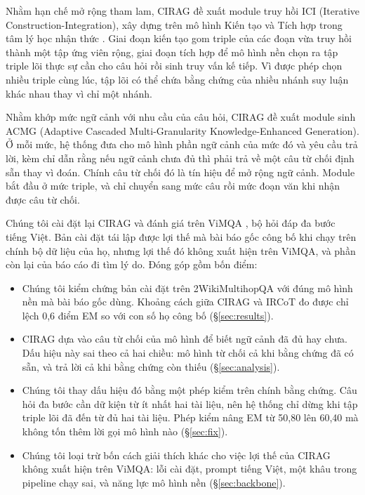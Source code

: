 \documentclass[11pt]{article}
\begin{document}
Nhằm hạn chế mở rộng tham lam, CIRAG đề xuất module truy hồi ICI (Iterative
Construction-Integration), xây dựng trên mô hình Kiến tạo và Tích hợp trong tâm lý học nhận
thức \citep{kintsch1978ci}. Giai đoạn kiến tạo gom triple của các đoạn vừa truy hồi thành
một tập ứng viên rộng, giai đoạn tích hợp để mô hình nền chọn ra tập triple lõi thực sự cần
cho câu hỏi rồi sinh truy vấn kế tiếp. Vì được phép chọn nhiều triple cùng lúc, tập lõi có
thể chứa bằng chứng của nhiều nhánh suy luận khác nhau thay vì chỉ một nhánh.

Nhằm khớp mức ngữ cảnh với nhu cầu của câu hỏi, CIRAG đề xuất module sinh ACMG (Adaptive
Cascaded Multi-Granularity Knowledge-Enhanced Generation). Ở mỗi mức, hệ thống đưa cho mô
hình phần ngữ cảnh của mức đó và yêu cầu trả lời, kèm chỉ dẫn rằng nếu ngữ cảnh chưa đủ thì
phải trả về một câu từ chối định sẵn thay vì đoán. Chính câu từ chối đó là tín hiệu để mở
rộng ngữ cảnh. Module bắt đầu ở mức triple, và chỉ chuyển sang mức câu rồi mức đoạn văn khi
nhận được câu từ chối.

Chúng tôi cài đặt lại CIRAG và đánh giá trên ViMQA \citep{le2022vimqa}, bộ hỏi đáp đa bước
tiếng Việt. Bản cài đặt tái lập được lợi thế mà bài báo gốc công bố khi chạy trên chính bộ
dữ liệu của họ, nhưng lợi thế đó không xuất hiện trên ViMQA, và phần còn lại của báo cáo đi
tìm lý do. Đóng góp gồm bốn điểm:

\begin{itemize}
  \itemsep0.1em
  \item Chúng tôi kiểm chứng bản cài đặt trên 2WikiMultihopQA với đúng mô hình nền mà bài
        báo gốc dùng. Khoảng cách giữa CIRAG và IRCoT đo được chỉ lệch 0,6 điểm EM so với
        con số họ công bố (\S\ref{sec:results}).
  \item CIRAG dựa vào câu từ chối của mô hình để biết ngữ cảnh đã đủ hay chưa. Dấu hiệu này
        sai theo cả hai chiều: mô hình từ chối cả khi bằng chứng đã có sẵn, và trả lời cả
        khi bằng chứng còn thiếu (\S\ref{sec:analysis}).
  \item Chúng tôi thay dấu hiệu đó bằng một phép kiểm trên chính bằng chứng. Câu hỏi đa bước
        cần dữ kiện từ ít nhất hai tài liệu, nên hệ thống chỉ dừng khi tập triple lõi đã
        đến từ đủ hai tài liệu. Phép kiểm nâng EM từ 50,80 lên 60,40 mà không tốn thêm
        lời gọi mô hình nào (\S\ref{sec:fix}).
  \item Chúng tôi loại trừ bốn cách giải thích khác cho việc lợi thế của CIRAG không xuất
        hiện trên ViMQA: lỗi cài đặt, prompt tiếng Việt, một khâu trong pipeline chạy sai, và
        năng lực mô hình nền (\S\ref{sec:backbone}).
\end{itemize}
\end{document}

